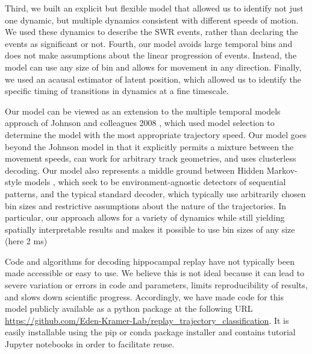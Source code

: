 \documentclass[times, twoside]{zHenriquesLab-StyleBioRxiv}
\begin{document}
Third, we built an explicit but flexible model that allowed us to identify not just one dynamic, but multiple dynamics consistent with different speeds of motion. We used these dynamics to describe the SWR events, rather than declaring the events as significant or not. Fourth, our model avoids large temporal bins and does not make assumptions about the linear progression of events. Instead, the model can use any size of bin and allows for movement in any direction. Finally, we used an acausal estimator of latent position, which allowed us to identify the specific timing of transitions in dynamics at a fine timescale.

Our model can be viewed as an extension to the multiple temporal models approach of Johnson and colleagues 2008 \cite{JohnsonMeasuringdistributedproperties2008}, which used model selection to determine the model with the most appropriate trajectory speed. Our model goes beyond the Johnson model in that it explicitly permits a mixture between the movement speeds, can work for arbitrary track geometries, and uses clusterless decoding. Our model also represents a middle ground between Hidden Markov-style models \cite{MaboudiUncoveringtemporalstructure2018, ChenBayesiannonparametricmethods2016, LindermanBayesiannonparametricapproach2016, ChenUncoveringspatialtopology2012}, which seek to be environment-agnostic detectors of sequential patterns, and the typical standard decoder, which typically use arbitrarily chosen bin sizes and restrictive assumptions about the nature of the trajectories. In particular, our approach allows for a variety of dynamics while still yielding spatially interpretable results and makes it possible to use bin sizes of any size (here 2 ms)

Code and algorithms for decoding hippocampal replay have not typically been made accessible or easy to use. We believe this is not ideal because it can lead to severe variation or errors in code and parameters, limits reproducibility of results, and slows down scientific progress. Accordingly, we have made code for this model publicly available as a python package at the following URL \url{https://github.com/Eden-Kramer-Lab/replay_trajectory_classification}. It is easily installable using the pip or conda package installer and contains tutorial Jupyter notebooks in order to facilitate reuse.
\end{document}
